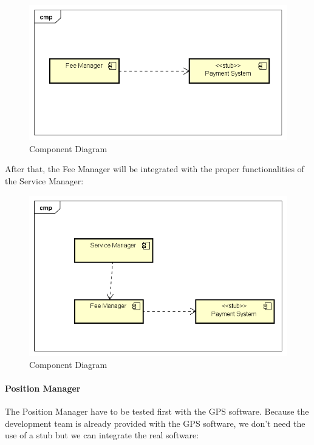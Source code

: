 \begin{figure}[H]	
	\centering
	\includegraphics[width=\textwidth]{img/FeeMan_PaySys_int}
	\caption{Component Diagram}
\end{figure}
After that, the Fee Manager will be integrated with the proper functionalities of the Service Manager:

\begin{figure}[H]	
	\centering
	\includegraphics[width=\textwidth]{img/FeeMan_SrvMan_int}
	\caption{Component Diagram}
\end{figure}
\paragraph{Position Manager}
The Position Manager have to be tested first with the GPS software. Because the development team is already provided with the GPS software, we don't need the use of a stub but we can integrate the real software:

